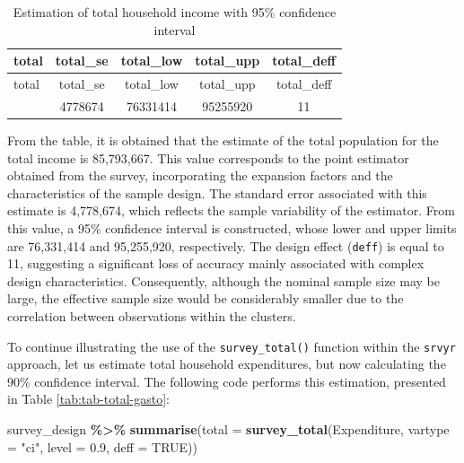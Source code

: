 \documentclass[
  english,
  12pt,
]{book}
\newenvironment{Shaded}{\begin{snugshade}}{\end{snugshade}}
\newcommand{\AttributeTok}[1]{\textcolor[rgb]{0.13,0.29,0.53}{#1}}
\newcommand{\ConstantTok}[1]{\textcolor[rgb]{0.56,0.35,0.01}{#1}}
\newcommand{\FloatTok}[1]{\textcolor[rgb]{0.00,0.00,0.81}{#1}}
\newcommand{\FunctionTok}[1]{\textcolor[rgb]{0.13,0.29,0.53}{\textbf{#1}}}
\newcommand{\NormalTok}[1]{#1}
\newcommand{\SpecialCharTok}[1]{\textcolor[rgb]{0.81,0.36,0.00}{\textbf{#1}}}
\newcommand{\StringTok}[1]{\textcolor[rgb]{0.31,0.60,0.02}{#1}}
\begin{document}
\begin{longtable}[]{@{}lcccc@{}}
\caption{\label{tab:tab-total-ingreso}Estimation of total household income with 95\% confidence interval}\tabularnewline
\toprule\noalign{}
total & total\_se & total\_low & total\_upp & total\_deff \\
\midrule\noalign{}
\endfirsthead
\toprule\noalign{}
total & total\_se & total\_low & total\_upp & total\_deff \\
\midrule\noalign{}
\endhead
\bottomrule\noalign{}
\endlastfoot
85793667 & 4778674 & 76331414 & 95255920 & 11 \\
\end{longtable}

From the table, it is obtained that the estimate of the total population for the total income is 85,793,667. This value corresponds to the point estimator obtained from the survey, incorporating the expansion factors and the characteristics of the sample design. The standard error associated with this estimate is 4,778,674, which reflects the sample variability of the estimator. From this value, a 95\% confidence interval is constructed, whose lower and upper limits are 76,331,414 and 95,255,920, respectively. The design effect (\texttt{deff}) is equal to 11, suggesting a significant loss of accuracy mainly associated with complex design characteristics. Consequently, although the nominal sample size may be large, the effective sample size would be considerably smaller due to the correlation between observations within the clusters.

To continue illustrating the use of the \texttt{survey\_total()} function within the \texttt{srvyr} approach, let us estimate total household expenditures, but now calculating the 90\% confidence interval. The following code performs this estimation, presented in Table \ref{tab:tab-total-gasto}:

\begin{Shaded}
\begin{Highlighting}[]
\NormalTok{survey\_design }\SpecialCharTok{\%\textgreater{}\%}
  \FunctionTok{summarise}\NormalTok{(}\AttributeTok{total =} \FunctionTok{survey\_total}\NormalTok{(Expenditure,}
                              \AttributeTok{vartype =} \StringTok{"ci"}\NormalTok{, }\AttributeTok{level =} \FloatTok{0.9}\NormalTok{,}
                              \AttributeTok{deff =} \ConstantTok{TRUE}\NormalTok{))}
\end{Highlighting}
\end{Shaded}
\end{document}

